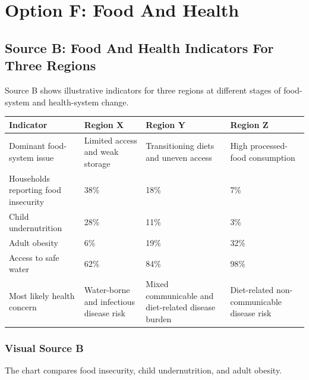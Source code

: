 \documentclass[11pt,a4paper]{article}
\begin{document}
\newpage

\section{Option F: Food And Health}

\subsection{Source B: Food And Health Indicators For Three Regions}

Source B shows illustrative indicators for three regions at different stages
of food-system and health-system change.

\begin{tabularx}{\textwidth}{L{0.27\textwidth}C{0.18\textwidth}C{0.18\textwidth}C{0.18\textwidth}}
\toprule
\textbf{Indicator} & \textbf{Region X} & \textbf{Region Y} & \textbf{Region Z} \\
\midrule
Dominant food-system issue & Limited access and weak storage & Transitioning
diets and uneven access & High processed-food consumption \\
Households reporting food insecurity & 38\% & 18\% & 7\% \\
Child undernutrition & 28\% & 11\% & 3\% \\
Adult obesity & 6\% & 19\% & 32\% \\
Access to safe water & 62\% & 84\% & 98\% \\
Most likely health concern & Water-borne and infectious disease risk & Mixed
communicable and diet-related disease burden & Diet-related non-communicable
disease risk \\
\bottomrule
\end{tabularx}

\subsubsection{Visual Source B}

The chart compares food insecurity, child undernutrition, and adult obesity.
\end{document}
